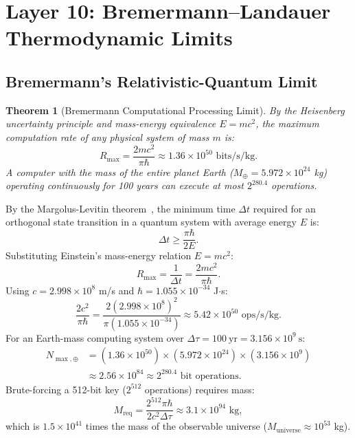 \documentclass{ieeeaccess}
\newtheorem{theorem}{Theorem}
\newenvironment{proof}{\begin{IEEEproof}\IEEEQEDoff}{\end{IEEEproof}}
\begin{document}
\section{Layer 10: Bremermann--Landauer Thermodynamic Limits}
\label{sec:L10}

\subsection{Bremermann's Relativistic-Quantum Limit}
\begin{theorem}[Bremermann Computational Processing Limit]
\label{thm:L10-brem}
By the Heisenberg uncertainty principle and mass-energy equivalence $E = mc^2$, the maximum computation rate of any physical system of mass $m$ is:
\begin{equation}
  R_{\max} = \frac{2 m c^2}{\pi \hbar} \approx 1.36 \times 10^{50} \text{ bits/s/kg}.
\end{equation}
A computer with the mass of the entire planet Earth ($M_\oplus = 5.972 \times 10^{24}$ kg) operating continuously for 100 years can execute at most $2^{280.4}$ operations.
\end{theorem}
\begin{proof}
By the Margolus-Levitin theorem~\cite{MargolusLevitin1998}, the minimum time $\Delta t$ required for an orthogonal state transition in a quantum system with average energy $E$ is:
\begin{equation}
  \Delta t \geq \frac{\pi \hbar}{2 E}.
\end{equation}
Substituting Einstein's mass-energy relation $E = mc^2$:
\begin{equation}
  R_{\max} = \frac{1}{\Delta t} = \frac{2 m c^2}{\pi \hbar}.
\end{equation}
Using $c = 2.998 \times 10^8$ m/s and $\hbar = 1.055 \times 10^{-34}$ J$\cdot$s:
\begin{equation}
  \frac{2 c^2}{\pi \hbar} = \frac{2 (2.998 \times 10^8)^2}{\pi (1.055 \times 10^{-34})} \approx 5.42 \times 10^{50} \text{ ops/s/kg}.
\end{equation}
For an Earth-mass computing system over $\Delta \tau = 100\ \text{yr} = 3.156 \times 10^9\ \text{s}$:
\begin{equation}
\begin{aligned}
  N_{\max, \oplus} &= (1.36 \times 10^{50}) \times (5.972 \times 10^{24}) \times (3.156 \times 10^9) \\
  &\approx 2.56 \times 10^{84} \approx 2^{280.4} \text{ bit operations}.
\end{aligned}
\end{equation}
Brute-forcing a 512-bit key ($2^{512}$ operations) requires mass:
\begin{equation}
  M_{\mathrm{req}} = \frac{2^{512} \pi \hbar}{2 c^2 \Delta \tau} \approx 3.1 \times 10^{94} \text{ kg},
\end{equation}
which is $1.5 \times 10^{41}$ times the mass of the observable universe ($M_{\mathrm{universe}} \approx 10^{53}$ kg).
\end{proof}
\end{document}
